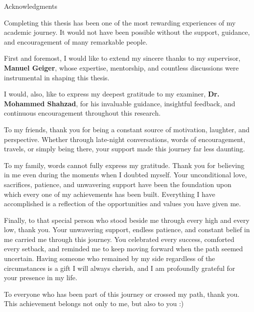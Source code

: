 \thispagestyle{empty}

\vspace*{20mm}

\begin{center}
    { Acknowledgments}
\end{center}

\vspace{10mm}

Completing this thesis has been one of the most rewarding experiences of my academic journey. It would not have been possible without the support, guidance, and encouragement of many remarkable people.

First and foremost, I would like to extend my sincere thanks to my supervisor, \textbf{Manuel Geiger}, whose expertise, mentorship, and countless discussions were instrumental in shaping this thesis.

I would, also, like to express my deepest gratitude to my examiner, \textbf{Dr. Mohammed Shahzad}, for his invaluable guidance, insightful feedback, and continuous encouragement throughout this research. 

To my friends, thank you for being a constant source of motivation, laughter, and perspective. Whether through late-night conversations, words of encouragement, travels, or simply being there, your support made this journey far less daunting.

To my family, words cannot fully express my gratitude. Thank you for believing in me even during the moments when I doubted myself. Your unconditional love, sacrifices, patience, and unwavering support have been the foundation upon which every one of my achievements has been built. Everything I have accomplished is a reflection of the opportunities and values you have given me.

Finally, to that special person who stood beside me through every high and every low, thank you. Your unwavering support, endless patience, and constant belief in me carried me through this journey. You celebrated every success, comforted every setback, and reminded me to keep moving forward when the path seemed uncertain. Having someone who remained by my side regardless of the circumstances is a gift I will always cherish, and I am profoundly grateful for your presence in my life.

To everyone who has been part of this journey or crossed my path, thank you. This achievement belongs not only to me, but also to you :)
\cleardoublepage{}
